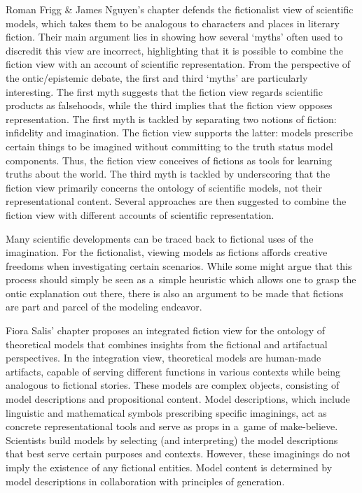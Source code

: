 Roman Frigg \& James Nguyen's chapter defends the fictionalist view of scientific models, which takes them to be analogous to characters and places in literary fiction. Their main argument lies in showing how several ‘myths' often used to discredit this view are incorrect, highlighting that it is possible to combine the fiction view with an account of scientific representation. From the perspective of the ontic/epistemic debate, the first and third ‘myths' are particularly interesting. The first myth suggests that the fiction view regards scientific products as falsehoods, while the third implies that the fiction view opposes representation. The first myth is tackled by separating two notions of fiction: infidelity and imagination. The fiction view supports the latter: models prescribe certain things to be imagined without committing to the truth status model components. Thus, the fiction view conceives of fictions as tools for learning truths about the world. The third myth is tackled by underscoring that the fiction view primarily concerns the ontology of scientific models, not their representational content. Several approaches are then suggested to combine the fiction view with different accounts of scientific representation.

Many scientific developments can be traced back to fictional uses of the imagination. For the fictionalist, viewing models as fictions affords creative freedoms when investigating certain scenarios. While some might argue that this process should simply be seen as a~simple heuristic which allows one to grasp the ontic explanation out there, there is also an argument to be made that fictions are part and parcel of the modeling endeavor.

Fiora Salis' chapter proposes an integrated fiction view for the ontology of theoretical models that combines insights from the fictional and artifactual perspectives. In the integration view, theoretical models are human-made artifacts, capable of serving different functions in various contexts while being analogous to fictional stories. These models are complex objects, consisting of model descriptions and propositional content. Model descriptions, which include linguistic and mathematical symbols prescribing specific imaginings, act as concrete representational tools and serve as props in a~game of make-believe. Scientists build models by selecting (and interpreting) the model descriptions that best serve certain purposes and contexts. However, these imaginings do not imply the existence of any fictional entities. Model content is determined by model descriptions in collaboration with principles of generation.

